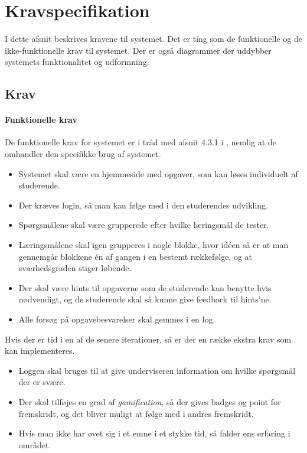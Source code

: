 \documentclass[11pt, a4paper]{article}
\begin{document}
\section{Kravspecifikation}
\label{sec:kravspecifikation}
I dette afsnit beskrives kravene til systemet. Det er ting som de funktionelle og de ikke-funktionelle krav til systemet. Der er også diagrammer der uddybber systemets funktionalitet og udformning.
\subsection{Krav}
\label{sub:krav}
\paragraph{Funktionelle krav}
De funktionelle krav for systemet er i tråd med afsnit 4.3.1 i \cite{OOSE}, nemlig at de omhandler den specifikke brug af systemet.
\begin{itemize}
    \item Systemet skal være en hjemmeside med opgaver, som kan løses individuelt af studerende.
    \item Der kræves login, så man kan følge med i den studerendes udvikling.
    \item Spørgsmålene skal være grupperede efter hvilke læringsmål de tester.
    \item Læringsmålene skal igen grupperes i nogle blokke, hvor idéen så er at man gennemgår blokkene én af gangen i en bestemt rækkefølge, og at sværhedsgraden stiger løbende.
    \item Der skal være hints til opgaverne som de studerende kan benytte hvis nødvendigt, og de studerende skal så kunne give feedback til hints'ne.
    \item Alle forsøg på opgavebesvarelser skal gemmes i en log.
\end{itemize}
Hvis der er tid i en af de senere iterationer, så er der en række ekstra krav som kan implementeres.
\begin{itemize}
    \item Loggen skal bruges til at give underviseren information om hvilke spørgsmål der er svære.
    \item Der skal tilføjes en grad af \emph{gamification}, så der gives badges og point for fremskridt, og det bliver muligt at følge med i andres fremskridt.
    \item Hvis man ikke har øvet sig i et emne i et stykke tid, så falder ens erfaring i området.
\end{itemize}
\end{document}
